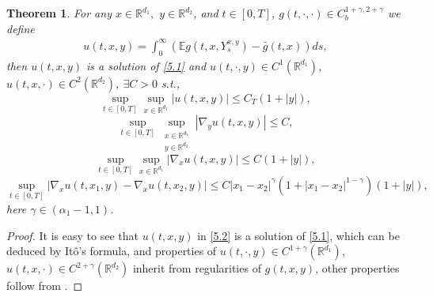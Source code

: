 \documentclass[11pt,reqno]{amsart}
\newtheorem{theorem}{\indent Theorem}[section]
\newtheorem{lemma}{\indent Lemma}[section]
\numberwithin{equation}{section}
\begin{document}
\begin{theorem}\label{T51}
	For any  $x\in \mathbb{R}^{d_{1}}, $  $y\in \mathbb{R}^{d_{2}} $, and $t\in [0,T]$, $g(t,\cdot,\cdot)\in C_{b}^{1+\gamma, 2+\gamma}$ we define 
	\begin{equation}\label{5.2}
		\begin{split}
			u(t,x,y)=\int^{\infty}_{0}\left( \mathbb{E}g(t,x,Y_{s}^{x,y})-\bar{g}(t,x)\right) ds,
		\end{split}
	\end{equation}
	then $u(t,x,y)$ is a solution of \eqref{5.1} and  $u(t,\cdot,y)\in C^{1}(\mathbb{R}^{d_{1}})$, $u(t,x,\cdot)\in C^{2}(\mathbb{R}^{d_{2}})$, $\exists C>0$ s.t.,
	\begin{equation}\label{5.3}
		\sup_{t\in [0,T]}\sup_{x\in \mathbb{R}^{d_{1}}}|u(t,x,y)|\leq C_{T}(1+|y|),
	\end{equation}
	\begin{equation}\label{5.4}
		\sup_{t\in [0,T]}\sup_{\substack{x\in \mathbb{R}^{d_{1}}\\ y\in \mathbb{R}^{d_{2}}}}|\nabla_{y}u(t,x,y)|\leq C,
	\end{equation}
	\begin{equation}\label{5.5}
		\sup_{t\in [0,T]}\sup_{x\in \mathbb{R}^{d_{1}}}|\nabla_{x}u(t,x,y)|\leq C(1+|y|),
	\end{equation}
	\begin{equation}\label{5.6}
		\sup_{t\in [0,T]}|\nabla_{x}u(t,x_{1},y)-\nabla_{x}u(t,x_{2},y)|\leq C|x_{1}-x_{2}|^{\gamma}(1+|x_{1}-x_{2}|^{1-\gamma})(1+|y|),
	\end{equation}
	here $\gamma\in (\alpha_{1}-1,1)$.
\end{theorem}
\begin{proof}
	It is easy to see that $u(t,x,y)$ in \eqref{5.2} is a solution of \eqref{5.1}, which can be deduced by It\^{o}'s formula, and properties of  $u(t,\cdot,y)\in C^{1+\gamma}(\mathbb{R}^{d_{1}})$, $u(t,x,\cdot)\in C^{2+\gamma}(\mathbb{R}^{d_{2}})$ inherit from  regularities of $g(t,x,y)$, other properties follow from \cite[Proposition 3.3]{SXX}.
\end{proof}
\fi

\end{document}
